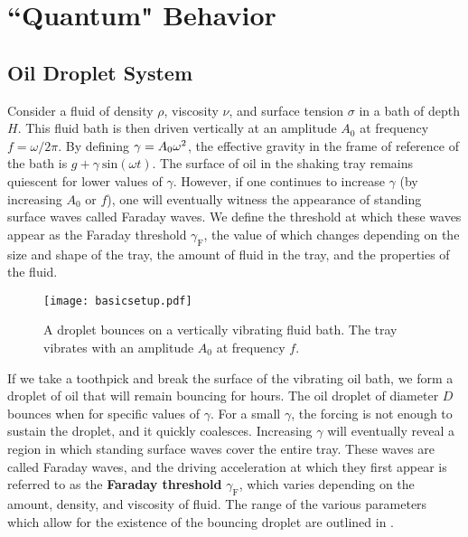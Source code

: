 \chapter{``Quantum" Behavior}
\label{Ch1}

\section{Oil Droplet System}
	    \label{parameters}
	       Consider a fluid of density $\rho$, viscosity $\nu$, and surface tension $\sigma$ in a bath of depth $H$. This fluid bath is then driven vertically at an amplitude $A_0$ at frequency $f=\omega/{2\pi}$. By defining $\mathnormal{\gamma}=A_0\omega^2$, the effective gravity in the frame of reference of the bath is $g+\gamma~\mathrm{sin}(\omega t)$. The surface of oil in the shaking tray remains quiescent for lower values of $\gamma$. However, if one continues to increase $\gamma$ (by increasing $A_0$ or $f$), one will eventually witness the appearance of standing surface waves called Faraday waves. We define the threshold at which these waves appear as the Faraday threshold $\gamma_\mathrm{F}$, the value of which changes depending on the size and shape of the tray, the amount of fluid in the tray, and the properties of the fluid. 
	       
	   \begin{figure}[h]
	       \centering
	    \texttt{[image: basicsetup.pdf]}
	     \caption{A droplet bounces on a vertically vibrating fluid bath. The tray vibrates with an amplitude $A_0$ at frequency $f$.}
	 \label{regime}
	\end{figure}
	       
	    If we take a toothpick and break the surface of the vibrating oil bath, we form a droplet of oil that will remain bouncing for hours. The oil droplet of diameter $D$ bounces when for specific values of $\gamma$. For a small $\gamma$, the forcing is not enough to sustain the droplet, and it quickly coalesces. Increasing $\gamma$ will eventually reveal a region in which standing surface waves cover the entire tray. These waves are called Faraday waves, and the driving acceleration at which they first appear is referred to as the \textbf{Faraday threshold} $\gamma_\mathrm{F}$, which varies depending on the amount, density, and viscosity of fluid. The range of the various parameters which allow for the existence of the bouncing droplet are outlined in . 
	      
